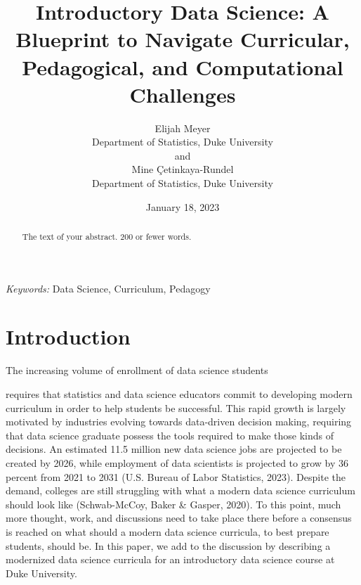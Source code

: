 \documentclass[
  12pt]{article}
\begin{document}
\def\spacingset#1{\renewcommand{\baselinestretch}%
{#1}\small\normalsize} \spacingset{1}



\date{January 18, 2023}
\title{\bf Introductory Data Science: A Blueprint to Navigate
Curricular, Pedagogical, and Computational Challenges}
\author{
Elijah Meyer\\
Department of Statistics, Duke University\\
and\\Mine Çetinkaya-Rundel\\
Department of Statistics, Duke University\\
}
\maketitle

\bigskip
\bigskip
\begin{abstract}
The text of your abstract. 200 or fewer words.
\end{abstract}

\noindent%
{\it Keywords:} Data Science, Curriculum, Pedagogy
\vfill

\newpage
\spacingset{1.9} %
\ifdefined\Shaded\renewenvironment{Shaded}{\begin{tcolorbox}[enhanced, borderline west={3pt}{0pt}{shadecolor}, sharp corners, boxrule=0pt, breakable, interior hidden, frame hidden]}{\end{tcolorbox}}\fi

\hypertarget{sec-intro}{%
\section{Introduction}\label{sec-intro}}

The increasing volume of enrollment of data science students
\citep{Redmond2022}

\citep{Galyardt14mmm}

requires that statistics and data science educators commit to developing
modern curriculum in order to help students be successful. This rapid
growth is largely motivated by industries evolving towards data-driven
decision making, requiring that data science graduate possess the tools
required to make those kinds of decisions. An estimated 11.5 million new
data science jobs are projected to be created by 2026, while employment
of data scientists is projected to grow by 36 percent from 2021 to 2031
(U.S. Bureau of Labor Statistics, 2023). Despite the demand, colleges
are still struggling with what a modern data science curriculum should
look like (Schwab-McCoy, Baker \& Gasper, 2020). To this point, much
more thought, work, and discussions need to take place there before a
consensus is reached on what should a modern data science curricula, to
best prepare students, should be. In this paper, we add to the
discussion by describing a modernized data science curricula for an
introductory data science course at Duke University.
\end{document}
